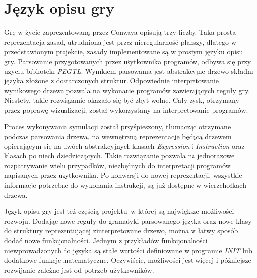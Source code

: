 \documentclass[declaration,shortabstract, inz]{iithesis}
\theoremstyle{definition} \newtheorem{definition}{Definicja}[]
\theoremstyle{plain} \newtheorem{remark}[definition]{Obserwacja}
\theoremstyle{plain} \newtheorem{theorem}[definition]{Twierdzenie}
\theoremstyle{plain} \newtheorem{example}{Przykład}[definition]
\theoremstyle{plain} \newtheorem{lemma}[definition]{Lemat}
\begin{document}
\section{Język opisu gry}
Grę w życie zaprezentowaną przez Conwaya opisują trzy liczby. Taka prosta reprezentacja zasad, utrudniona jest przez nieregularność planszy, dlatego w przedstawionym projekcie, zasady implementowane są w prostym języku opisu gry. Parsowanie przygotowanych przez użytkownika programów, odbywa się przy użyciu biblioteki \textit{PEGTL}. Wynikiem parsowania jest abstrakcyjne drzewo składni języka złożone z dostarczonych struktur. Odpowiednie interpretowanie wynikowego drzewa pozwala na wykonanie programów zawierających reguły gry. Niestety, takie rozwiązanie okazało się być zbyt wolne. Cały zysk, otrzymany przez poprawę wizualizacji, został wykorzystany na interpretowanie programów. 

Proces wykonywania symulacji został przyśpieszony, tłumacząc otrzymane podczas parsowania drzewa, na wewnętrzną reprezentację będącą drzewem opierającym się na dwóch abstrakcyjnych klasach \textit{Expression} i \textit{Instruction} oraz klasach po niech dziedziczących. Takie rozwiązanie pozwala na jednorazowe rozpatrywanie wielu przypadków, niezbędnych do interpretacji programów napisanych przez użytkownika. Po konwersji do nowej reprezentacji, wszystkie informacje potrzebne do wykonania instrukcji, są już dostępne w wierzchołkach drzewa.

Język opisu gry jest też częścią projektu, w której są największe możliwości rozwoju. Dodając nowe reguły do gramatyki parsowanego języka oraz nowe klasy do struktury reprezentującej zinterpretowane drzewo, można w łatwy sposób dodać nowe funkcjonalności. Jednym z przykładów funkcjonalności niewprowadzonych do języka są stałe wartości definiowane w programie \textit{INIT} lub dodatkowe funkcje matematyczne. Oczywiście, możliwości jest więcej i późniejsze rozwijanie zależne jest od potrzeb użytkowników.

\nocite{woronoj}


\end{document}
